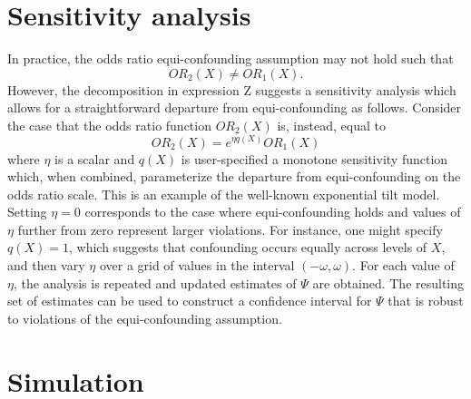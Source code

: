 \documentclass[11pt]{article}
\begin{document}
\section{Sensitivity analysis}
In practice, the odds ratio equi-confounding assumption may not hold such that
$$OR_2(X) \neq OR_1(X).$$ 
However, the decomposition in expression Z suggests a sensitivity analysis which allows for a straightforward departure from equi-confounding as follows. Consider the case that the odds ratio function $OR_2(X)$ is, instead, equal to
$$ OR_2(X) = e^{\eta q(X)} OR_1(X) $$
where $\eta$ is a scalar and $q(X)$ is user-specified a monotone sensitivity function which, when combined, parameterize the departure from equi-confounding on the odds ratio scale. This is an example of the well-known exponential tilt model. Setting $\eta = 0$ corresponds to the case where equi-confounding holds and values of $\eta$ further from zero represent larger violations. For instance, one might specify $q(X) = 1$, which suggests that confounding occurs equally across levels of $X$, and then vary $\eta$ over a grid of values in the interval $(-\omega, \omega)$. For each value of $\eta$, the analysis is repeated and updated estimates of $\Psi$ are obtained. The resulting set of estimates can be used to construct a confidence interval for $\Psi$ that is robust to violations of the equi-confounding assumption.

\section{Simulation}
\end{document}
